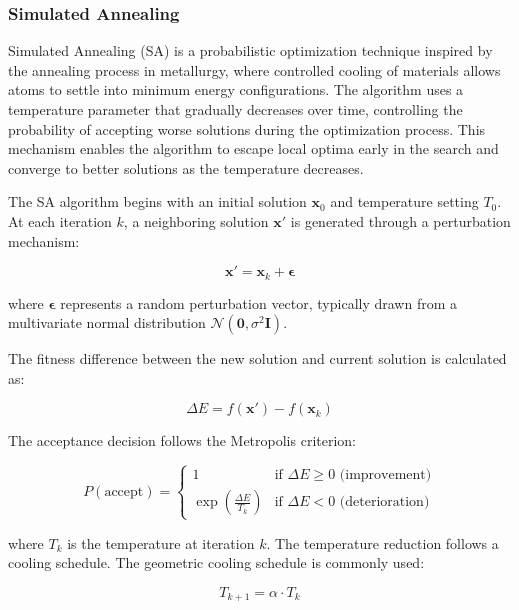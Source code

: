 \subsubsection{Simulated Annealing}

Simulated Annealing (SA) is a probabilistic optimization technique inspired by the annealing process in metallurgy, where controlled cooling of materials allows atoms to settle into minimum energy configurations. The algorithm uses a temperature parameter that gradually decreases over time, controlling the probability of accepting worse solutions during the optimization process. This mechanism enables the algorithm to escape local optima early in the search and converge to better solutions as the temperature decreases.

The SA algorithm begins with an initial solution $\mathbf{x}_0$ and temperature setting $T_0$. At each iteration $k$, a neighboring solution $\mathbf{x}'$ is generated through a perturbation mechanism:

\begin{equation}
\mathbf{x}' = \mathbf{x}_k + \boldsymbol{\epsilon}
\end{equation}

where $\boldsymbol{\epsilon}$ represents a random perturbation vector, typically drawn from a multivariate normal distribution $\mathcal{N}(\mathbf{0}, \sigma^2 \mathbf{I})$.

The fitness difference between the new solution and current solution is calculated as:

\begin{equation}
\Delta E = f(\mathbf{x}') - f(\mathbf{x}_k)
\end{equation}

The acceptance decision follows the Metropolis criterion:

\begin{equation}
P(\text{accept}) = \begin{cases}
1 & \text{if } \Delta E \geq 0 \text{ (improvement)} \\
\exp\left(\frac{\Delta E}{T_k}\right) & \text{if } \Delta E < 0 \text{ (deterioration)}
\end{cases}
\end{equation}

where $T_k$ is the temperature at iteration $k$. The temperature reduction follows a cooling schedule. The geometric cooling schedule is commonly used:

\begin{equation}
T_{k+1} = \alpha \cdot T_k
\end{equation}

